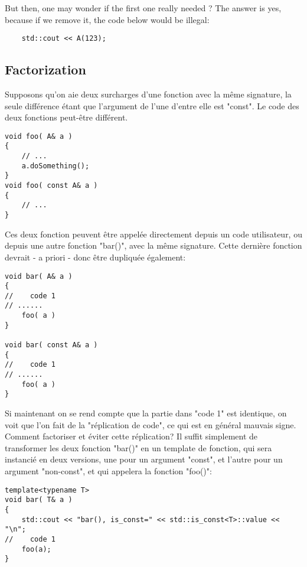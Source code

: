 \documentclass[11pt,a4paper]{article}
\begin{document}
But then, one may wonder if the first one really needed ?
The answer is yes, because if we remove it, the code below would be illegal:
\begin{lstlisting}
	std::cout << A(123);
\end{lstlisting}


\subsection{Factorization}
\label{ssec:facto1}

Supposons qu'on aie deux surcharges d'une fonction avec la même signature, la seule différence étant que l'argument de l'une d'entre elle est "const".
Le code des deux fonctions peut-être différent.
\begin{lstlisting}
void foo( A& a )
{
	// ...
	a.doSomething();
}
void foo( const A& a )
{
	// ...
}
\end{lstlisting}

Ces deux fonction peuvent être appelée directement depuis un code utilisateur, ou depuis une autre fonction "bar()", avec la même signature.
Cette dernière fonction devrait - a priori - donc être dupliquée également:
\begin{lstlisting}
void bar( A& a )
{
//    code 1
// ......
	foo( a )
}

void bar( const A& a )
{
//    code 1
// ......
	foo( a )
}
\end{lstlisting}

Si maintenant on se rend compte que la partie dans "code 1" est identique, on voit que l'on fait de la "réplication de code", ce qui est en général mauvais signe.
Comment factoriser et éviter cette réplication?
Il suffit simplement de transformer les deux fonction "bar()" en un template de fonction, qui sera instancié en deux versions, une pour un argument "const", et l'autre pour un argument "non-const", et qui appelera la fonction "foo()":


\begin{lstlisting}
template<typename T>
void bar( T& a )
{
    std::cout << "bar(), is_const=" << std::is_const<T>::value << "\n";
//    code 1    
	foo(a);
}
\end{lstlisting}
\end{document}
